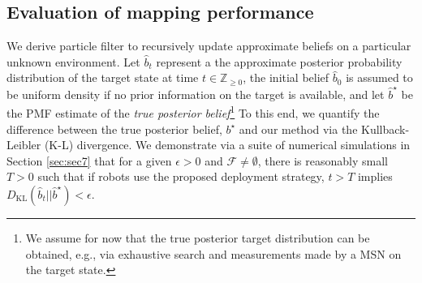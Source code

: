 \documentclass[letterpaper, 10 pt, conference]{ieeeconf}
\newcommand{\Ram}[1]{{\normalsize{\textbf{({\color{green}Ram:\ }#1)}}}}
\begin{document}
\subsection{Evaluation of mapping performance}
\label{sec:sec25}
We derive particle filter to recursively update approximate beliefs on a particular unknown environment. Let $\hat{b}_t$ represent a the approximate posterior probability distribution of the target state at time $t \in \mathbb{Z}_{\geq 0}$, the initial belief $\hat{b}_0$ is assumed to be uniform density if no prior information on the target is available, and let $\hat{b}^{\star}$ be the PMF estimate of the \emph{true posterior belief}\footnote{We assume for now that the true posterior target distribution can be obtained, e.g., via exhaustive search and measurements made by a MSN on the target state.} 
To this end, we quantify the difference between the true posterior belief, $b^{\star}$ and our method via the Kullback-Leibler (K-L) divergence.
We demonstrate via a suite of numerical simulations in Section \ref{sec:sec7} that for a given $\epsilon>0$ and $\mathcal{F} \neq \emptyset$, there is reasonably small $T >0$ such that if robots use the proposed deployment strategy, $t>T$ implies $D_{\text{KL}}(\hat{b}_{t} || \hat{b}^{\star}) < \epsilon$.

\end{document}

